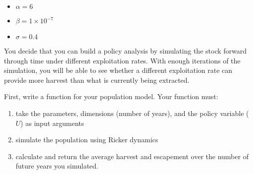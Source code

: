 \documentclass[]{book}
\providecommand{\tightlist}{%
  \setlength{\itemsep}{0pt}\setlength{\parskip}{0pt}}
\begin{document}
\begin{itemize}
\tightlist
\item
  \(\alpha = 6\)
\item
  \(\beta = 1 \times 10^{-7}\)
\item
  \(\sigma = 0.4\)
\end{itemize}

You decide that you can build a policy analysis by simulating the stock forward through time under different exploitation rates. With enough iterations of the simulation, you will be able to see whether a different exploitation rate can provide more harvest than what is currently being extracted.

First, write a function for your population model. Your function must:

\begin{enumerate}
\def\labelenumi{\arabic{enumi}.}
\tightlist
\item
  take the parameters, dimensions (number of years), and the policy variable (\(U\)) as input arguments
\item
  simulate the population using Ricker dynamics
\item
  calculate and return the average harvest and escapement over the number of future years you simulated.
\end{enumerate}
\end{document}
